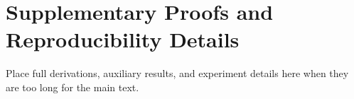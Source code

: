 \section{Supplementary Proofs and Reproducibility Details}
\label{sec:appendix}

Place full derivations, auxiliary results, and experiment details here when
they are too long for the main text.

